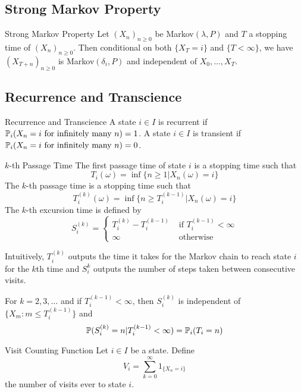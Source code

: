 \documentclass[a4paper]{article}
\begin{document}
\subsection{Strong Markov Property}
\begin{thm}{Strong Markov Property}{} Let $(X_n)_{n\geq 0}$ be Markov$(\lambda,P)$ and $T$ a stopping time of $(X_n)_{n\geq 0}$. Then conditional on both $\{X_T=i\}$ and $\{T<\infty\}$, we have $(X_{T+n})_{n\geq 0}$ is Markov$(\delta_i,P)$ and independent of $X_0,\dots,X_T$. 
\end{thm}

\subsection{Recurrence and Transcience}
\begin{defn}{Recurrence and Transcience}{} A state $i\in I$ is recurrent if $\mathbb{P}_i(X_n=i\text{ for infinitely many }n)=1$. A state $i\in I$ is transient if $\mathbb{P}_i(X_n=i\text{ for infinitely many }n)=0$. 
\end{defn}

\begin{defn}{$k$-th Passage Time}{} The first passage time of state $i$ is a stopping time such that $$T_i(\omega)=\inf\{n\geq 1|X_n(\omega)=i\}$$ The $k$-th passage time is a stopping time such that $$T_i^{(k)}(\omega)=\inf\{n\geq T_i^{(k-1)}|X_n(\omega)=i\}$$ The $k$-th excursion time is defined by $$S_i^{(k)}=\begin{cases}
T_i^{(k)}-T_i^{(k-1)} & \text{ if }T_i^{(k-1)}<\infty\\
\infty & \text{ otherwise }
\end{cases}$$
\end{defn}

Intuitively, $T_i^{(k)}$ outputs the time it takes for the Markov chain to reach state $i$ for the $k$th time and $S_i^k$ outputs the number of steps taken between consecutive visits. 

\begin{lmm}{}{} For $k=2,3,\dots$ and if $T_i^{(k-1)}<\infty$, then $S_i^{(k)}$ is independent of $\{X_m:m\leq T_i^{(k-1)}\}$ and $$\mathbb{P}(S_i^{(k)}=n|T_i^{(k-1)}<\infty)=\mathbb{P}_i(T_i=n)$$
\end{lmm}

\begin{defn}{Visit Counting Function}{} Let $i\in I$ be a state. Define $$V_i=\sum_{k=0}^\infty1_{\{X_n=i\}}$$ the number of visits ever to state $i$. 
\end{defn}
\end{document}
